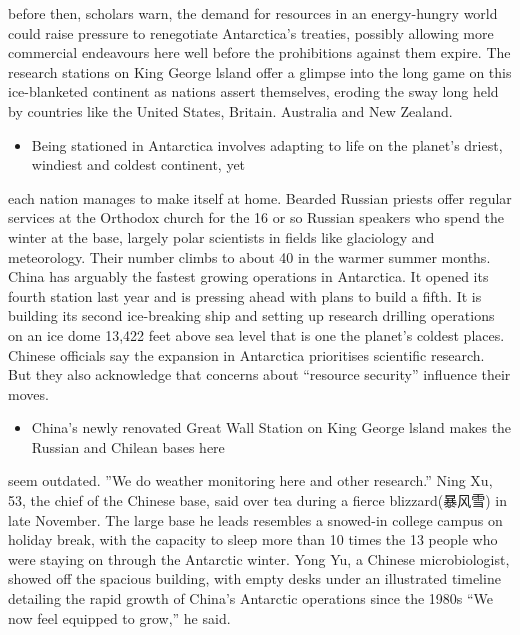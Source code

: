 \documentclass[UTF8,11pt]{ctexart}
\begin{document}
before then, scholars warn, the demand for resources in an energy-hungry world could raise pressure to renegotiate Antarctica’s treaties, possibly allowing more commercial endeavours here well before the prohibitions against them expire. The research stations on King George lsland offer a glimpse into the long game on this ice-blanketed continent as nations assert themselves, eroding the sway long held by countries like the United States, Britain. Australia and New Zealand.


\begin{itemize}[leftmargin=2em,itemsep=.2em,topsep=.4em]\item[J.] Being stationed in Antarctica involves adapting to life on the planet’s driest, windiest and coldest continent, yet
\end{itemize}

each nation manages to make itself at home. Bearded Russian priests offer regular services at the Orthodox church for the 16 or so Russian speakers who spend the winter at the base, largely polar scientists in fields like glaciology and meteorology. Their number climbs to about 40 in the warmer summer months. China has arguably the fastest growing operations in Antarctica. It opened its fourth station last year and is pressing ahead with plans to build a fifth. It is building its second ice-breaking ship and setting up research drilling operations on an ice dome 13,422 feet above sea level that is one the planet’s coldest places. Chinese officials say the expansion in Antarctica prioritises scientific research. But they also acknowledge that concerns about “resource security” influence their moves.


\begin{itemize}[leftmargin=2em,itemsep=.2em,topsep=.4em]\item[K.] China’s newly renovated Great Wall Station on King George lsland makes the Russian and Chilean bases here
\end{itemize}

seem outdated. ”We do weather monitoring here and other research.” Ning Xu, 53, the chief of the Chinese base, said over tea during a fierce blizzard(暴风雪) in late November. The large base he leads resembles a snowed-in college campus on holiday break, with the capacity to sleep more than 10 times the 13 people who were staying on through the Antarctic winter. Yong Yu, a Chinese microbiologist, showed off the spacious building, with empty desks under an illustrated timeline detailing the rapid growth of China’s Antarctic operations since the 1980s “We now feel equipped to grow,” he said.
\end{document}
